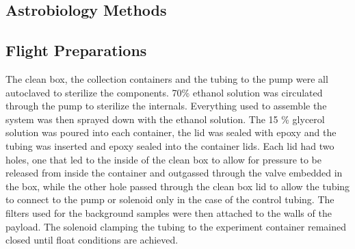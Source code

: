 \subsection{Astrobiology Methods}
\label{sec:Astrobiology Methods}
\subsection{ Flight Preparations }
 The clean box, the collection containers and the tubing to the pump were all autoclaved to sterilize the components. 70\% ethanol solution was circulated through the pump to sterilize the internals. Everything used to assemble the system was then sprayed down with the ethanol solution. The  15 \% glycerol solution was poured into each container, the lid was sealed with epoxy and the tubing was inserted and epoxy sealed into the container lids. Each lid had two holes, one that led to the inside of the clean box to allow for pressure to be released from inside the container and outgassed  through the valve embedded in the box, while the other hole passed through the clean box lid to allow the tubing to connect to the pump or solenoid only in the case of the control tubing. The filters used for the background samples were then attached to the walls of the payload. The solenoid clamping the tubing to the experiment container remained closed until float conditions are achieved. 